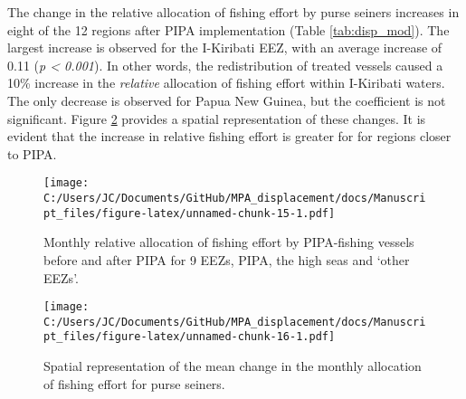 \documentclass[11pt,]{article}
\begin{document}
The change in the relative allocation of fishing effort by purse seiners
increases in eight of the 12 regions after PIPA implementation (Table
\ref{tab:disp_mod}). The largest increase is observed for the I-Kiribati
EEZ, with an average increase of 0.11 (\emph{p \textless{} 0.001}). In
other words, the redistribution of treated vessels caused a 10\%
increase in the \emph{relative} allocation of fishing effort within
I-Kiribati waters. The only decrease is observed for Papua New Guinea,
but the coefficient is not significant. Figure \ref{fig:map_change_ps}
provides a spatial representation of these changes. It is evident that
the increase in relative fishing effort is greater for for regions
closer to PIPA.

\begin{figure}
\centering
\texttt{[image: C:/Users/JC/Documents/GitHub/MPA\_displacement/docs/Manuscript\_files/figure-latex/unnamed-chunk-15-1.pdf]}
\caption{\label{fig:unnamed-chunk-15}\label{fig:redist_trend_ps}Monthly
relative allocation of fishing effort by PIPA-fishing vessels before and
after PIPA for 9 EEZs, PIPA, the high seas and `other EEZs'.}
\end{figure}

\begin{figure}
\centering
\texttt{[image: C:/Users/JC/Documents/GitHub/MPA\_displacement/docs/Manuscript\_files/figure-latex/unnamed-chunk-16-1.pdf]}
\caption{\label{fig:unnamed-chunk-16}\label{fig:map_change_ps}Spatial
representation of the mean change in the monthly allocation of fishing
effort for purse seiners.}
\end{figure}
\end{document}
